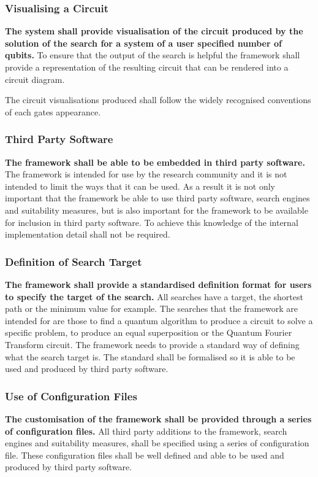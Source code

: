 \subsubsection{Visualising a Circuit}
\textbf{The system shall provide visualisation of the circuit produced by the solution of the search for a system of a user specified number of qubits.}
To ensure that the output of the search is helpful the framework shall provide a representation of the resulting circuit that can be rendered into a circuit diagram.

The circuit visualisations produced shall follow the widely recognised conventions of each gates appearance.

\subsubsection{Third Party Software}
\textbf{The framework shall be able to be embedded in third party software.}
The framework is intended for use by the research community and it is not intended to limit the ways that it can be used.
As a result it is not only important that the framework be able to use third party software, search engines and suitability measures, but is also important for the framework to be available for inclusion in third party software.
To achieve this knowledge of the internal implementation detail shall not be required.

\subsubsection{Definition of Search Target}
\textbf{The framework shall provide a standardised definition format for users to specify the target of the search.}
All searches have a target, the shortest path or the minimum value for example.
The searches that the framework are intended for are those to find a quantum algorithm to produce a circuit to solve a specific problem, to produce an equal superposition or the Quantum Fourier Transform circuit.
The framework needs to provide a standard way of defining what the search target is.
The standard shall be formalised so it is able to be used and produced by third party software.

\subsubsection{Use of Configuration Files}
\textbf{The customisation of the framework shall be provided through a series of configuration files.}
All third party additions to the framework, search engines and suitability measures, shall be specified using a series of configuration file.
These configuration files shall be well defined and able to be used and produced by third party software.

